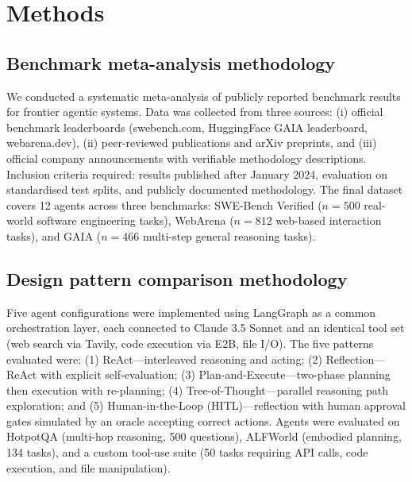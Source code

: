 \documentclass[10pt]{article}
\begin{document}
\newpage
\section*{Methods}\label{sec:methods}

\subsection*{Benchmark meta-analysis methodology}
We conducted a systematic meta-analysis of publicly reported benchmark results for frontier agentic systems. Data was collected from three sources: (i) official benchmark leaderboards (swebench.com, HuggingFace GAIA leaderboard, webarena.dev), (ii) peer-reviewed publications and arXiv preprints, and (iii) official company announcements with verifiable methodology descriptions. Inclusion criteria required: results published after January 2024, evaluation on standardised test splits, and publicly documented methodology. The final dataset covers 12 agents across three benchmarks: SWE-Bench Verified\cite{jimenez2024swebench} ($n=500$ real-world software engineering tasks), WebArena\cite{zhou2024webarena} ($n=812$ web-based interaction tasks), and GAIA\cite{mialon2023gaia} ($n=466$ multi-step general reasoning tasks).

\subsection*{Design pattern comparison methodology}
Five agent configurations were implemented using LangGraph as a common orchestration layer, each connected to Claude 3.5 Sonnet and an identical tool set (web search via Tavily, code execution via E2B, file I/O). The five patterns evaluated were: (1) ReAct\cite{yao2023react}---interleaved reasoning and acting; (2) Reflection\cite{shinn2023reflexion}---ReAct with explicit self-evaluation; (3) Plan-and-Execute---two-phase planning then execution with re-planning; (4) Tree-of-Thought\cite{yao2024tree}---parallel reasoning path exploration; and (5) Human-in-the-Loop (HITL)---reflection with human approval gates simulated by an oracle accepting correct actions. Agents were evaluated on HotpotQA (multi-hop reasoning, 500 questions), ALFWorld (embodied planning, 134 tasks), and a custom tool-use suite (50 tasks requiring API calls, code execution, and file manipulation).
\end{document}
